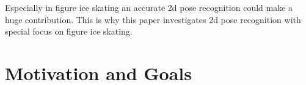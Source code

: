 \begin{flushleft}
Especially in figure ice skating an accurate 2d pose recognition could make a huge contribution.
This is why this paper investigates 2d pose recognition with special focus on figure ice skating.





%
%




\section{Motivation and Goals}


\end{flushleft}
